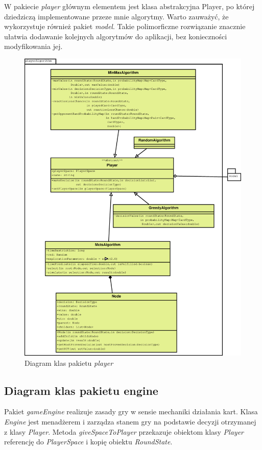 W pakiecie \textit{player} głównym elementem jest klasa abstrakcyjna Player, po której dziedziczą implementowane przeze mnie algorytmy. Warto zauważyć, że wykorzystuje również pakiet \textit{model}. Takie polimorficzne rozwiązanie znacznie ułatwia dodawanie kolejnych algorytmów do aplikacji, bez konieczności modyfikowania jej.
\clearpage
\begin{figure}[H]
	\centering
	\includegraphics[width=\textwidth]{Resources/diagramKlas_player.eps}
	\caption{Diagram klas pakietu \textit{player}} 
	\label{fig:diagramKlasPlayer}
\end{figure}

\subsection{Diagram klas pakietu engine}

Pakiet \textit{gameEngine} realizuje zasady gry w sensie mechaniki działania kart. Klasa \textit{Engine} jest menadżerem i zarządza stanem gry na podstawie decyzji otrzymanej z klasy \textit{Player}. Metoda \textit{giveSpaceToPlayer} przekazuje obiektom klasy \textit{Player} referencję do \textit{PlayerSpace} i kopię obiektu \textit{RoundState}. 

